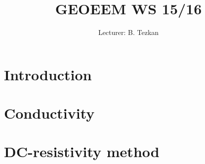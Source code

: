 \documentclass[11pt,a4paper]{article}
\title{GEOEEM WS 15/16}
\author{Lecturer: B. Tezkan}
\numberwithin{equation}{section}
\numberwithin{figure}{section}
\begin{document}
\graphicspath{ {figs/} }

\begin{titlepage}
\maketitle
\thispagestyle{empty}
\end{titlepage}
\newpage
\tableofcontents
\newpage


\section{Introduction}


\section{Conductivity}

\section{DC-resistivity method}

\end{document}
